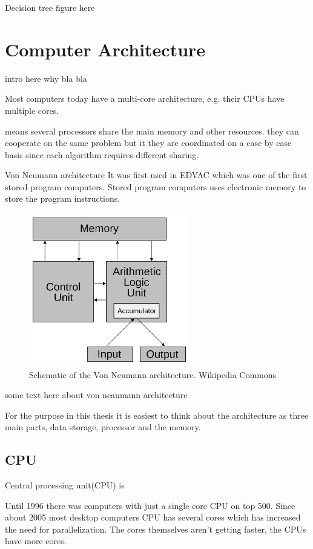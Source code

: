 \documentclass[10pt,a4paper]{report}
\begin{document}
Decision tree figure here %

\clearpage
\section{Computer Architecture} %
intro here why bla bla

Most computers today have a multi-core architecture, e.g. their CPUs have multiple cores.

means several processors share the main memory and other resources. they can cooperate on the same problem but it they are coordinated on a case by case basis since each algorithm requires different sharing.

Von Neumann architecture
It was first used in EDVAC which was one of the first stored program computers\cite{von1993first}. Stored program computers uses electronic memory to store the program instructions\cite{computer_arch_2003}.

\begin{figure}[h]
    \centering
    \includegraphics[width=7cm]{Von_Neumann_architecture.png}
    \caption{Schematic of the Von Neumann architecture. Wikipedia Commons}
    \label{fig:VonNeumann}
\end{figure}

some text here about von neaumann architecture

For the purpose in this thesis it is easiest to think about the architecture as three main parts, data storage, processor and the memory.

\subsection{CPU}
Central processing unit(CPU) is \cite{introduction_hpc_hager}

Until 1996 there was computers with just a single core CPU on top 500\cite{TOP500}. Since about 2005 most desktop computers CPU has several cores which has increased the need for parallelization. The cores themselves aren't getting faster, the CPUs have more cores.
\end{document}
